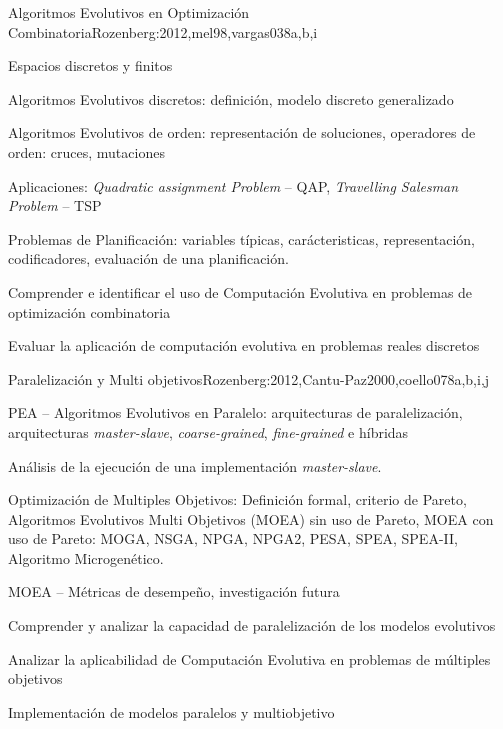 \begin{syllabus}
\begin{unit}{Algoritmos Evolutivos en Optimización Combinatoria}{Rozenberg:2012,mel98,vargas03}{8}{a,b,i}
\begin{topics}
  \item Espacios discretos y finitos
	\item Algoritmos Evolutivos discretos: definición, modelo discreto generalizado
  \item Algoritmos Evolutivos de orden: representación de soluciones, operadores de orden: cruces, mutaciones
	\item Aplicaciones: \textit{Quadratic assignment Problem} -- QAP, \textit{Travelling Salesman Problem} -- TSP
	\item Problemas de Planificación: variables típicas, carácteristicas, representación, codificadores, evaluación de una planificación. 
\end{topics}
\begin{learningoutcomes}
  \item Comprender e identificar el uso de Computación Evolutiva en problemas de optimización combinatoria
  \item Evaluar la aplicación de computación evolutiva en problemas reales discretos
\end{learningoutcomes}
\end{unit}

\begin{unit}{Paralelización y Multi objetivos}{Rozenberg:2012,Cantu-Paz2000,coello07}{8}{a,b,i,j}
\begin{topics}
  \item PEA -- Algoritmos Evolutivos en Paralelo: arquitecturas de paralelización, arquitecturas \textit{master-slave}, \textit{coarse-grained}, \textit{fine-grained} e híbridas 
  \item Análisis de la ejecución de una implementación \textit{master-slave}.
  \item Optimización de Multiples Objetivos: Definición formal, criterio de Pareto, Algoritmos Evolutivos Multi Objetivos (MOEA) sin uso de Pareto, MOEA con uso de Pareto: MOGA, NSGA, NPGA, NPGA2, PESA, SPEA, SPEA-II, Algoritmo Microgenético. 
	\item MOEA -- Métricas de desempeño, investigación futura
\end{topics}
\begin{learningoutcomes}
  \item Comprender y analizar la capacidad de paralelización de los modelos evolutivos
  \item Analizar la aplicabilidad de Computación Evolutiva en problemas de múltiples objetivos
  \item Implementación de modelos paralelos y multiobjetivo
\end{learningoutcomes}
\end{unit}


\end{syllabus}
